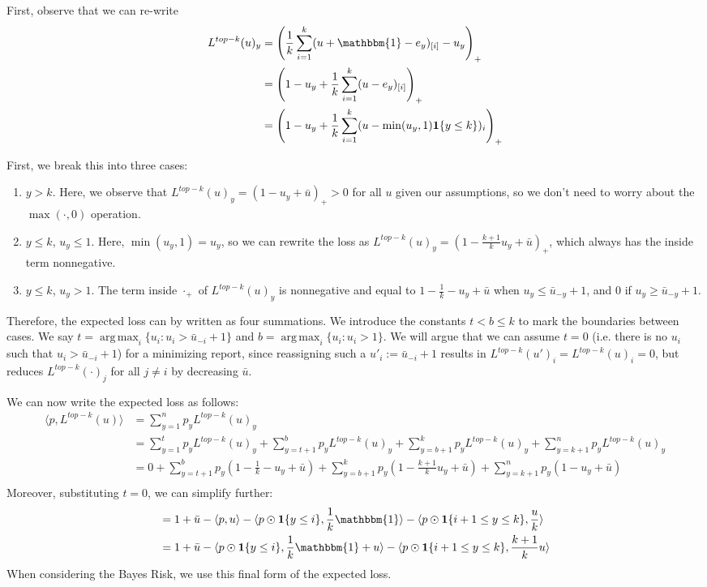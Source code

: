 \documentclass[12pt]{article}
\newcommand{\ubar}{\bar{u}}
\newcommand{\inprod}[2]{\langle #1, #2 \rangle}%
\newcommand{\ones}{\mathbbm{1}}
\newcommand{\Ind}[1]{\mathbf{1}\{#1\}}
\DeclareMathOperator*{\argmax}{arg\,max}
\begin{document}
First, observe that we can re-write
\begin{align*} 
L^{top-k}(u)_y&=\left(\frac{1}{k} \sum_{i=1}^k (u + \ones - e_y)_{[i]} - u_y \right)_+\\ 
&=\left(1 - u_y + \frac{1}{k} \sum_{i=1}^k (u - e_y)_{[i]} \right)_+\\
&=\left(1 - u_y + \frac{1}{k} \sum_{i=1}^k (u - \min(u_y, 1)\Ind{y \leq k})_{i} \right)_+\\
\end{align*}

First, we break this into three cases:
\begin{enumerate}
	\item $y > k$. Here, we observe that $L^{top-k}(u)_y = (1-u_y + \bar{u})_+ > 0$ for all $u$ given our assumptions, so we don't need to worry about the $\max(\cdot,0)$ operation.
	\item $y \leq k$, $u_y \leq 1$. Here, $\min(u_y,1) = u_y$, so we can rewrite the loss as $L^{top-k}(u)_y = (1 - \frac {k+1}{k} u_y + \bar u)_+$, which always has the inside term nonnegative.
	\item $y \leq k$, $u_y > 1$. The term inside $\cdot_+$ of $L^{top-k}(u)_y$ is nonnegative and equal to $1 - \frac 1 k - u_y + \ubar$ when $u_y \leq \bar{u}_{-y} + 1$, and $0$ if $u_y \geq \bar{u}_{-y} + 1$.
\end{enumerate}

Therefore, the expected loss can by written as four summations.
We introduce the constants $t < b \leq k$ to mark the boundaries between cases.
We say $t = \argmax_i \{u_i : u_i > \bar u_{-i} +1\}$ and $b = \argmax_i \{u_i : u_i > 1\}$.
We will argue that we can assume $t = 0$ (i.e. there is no $u_i$ such that $u_i > \bar u_{-i} +1$) for a minimizing report, since reassigning such a $u'_i := \bar u_{-i} +1$ results in $L^{top-k}(u')_i = L^{top-k}(u)_i = 0$, but reduces $L^{top-k}(\cdot)_j$ for all $j \neq i$ by decreasing $\ubar$.

We can now write the expected loss as follows:
\begin{align*}
\inprod{p}{L^{top-k}(u)} &= \sum_{y=1}^n p_y L^{top-k}(u)_y \\
&= \sum_{y=1}^t p_y L^{top-k}(u)_y + \sum_{y=t+1}^b p_y L^{top-k}(u)_y + \sum_{y=b+1}^k p_y L^{top-k}(u)_y + \sum_{y=k+1}^n p_y L^{top-k}(u)_y\\
&= 0 + \sum_{y=t+1}^b p_y (1 - \frac 1 k - u_y + \ubar) + \sum_{y=b+1}^k p_y (1 - \frac{k+1} k u_y + \ubar) + \sum_{y=k+1}^n p_y(1-u_y + \ubar)\\
\end{align*}
Moreover, substituting $t=0$, we can simplify further:
\begin{align*}
&= 1 + \ubar - \inprod{p}{u} - \inprod{p \odot \Ind{y \leq i}}{\frac 1 k \ones} - \inprod{p \odot \Ind{i+1 \leq y \leq k}}{ \frac u k}\\
&= 1 + \ubar - \inprod{p \odot \Ind{y \leq i}}{\frac 1 k \ones + u} - \inprod{p \odot \Ind{i+1 \leq y \leq k}}{ \frac {k+1} k u}\\
\end{align*}
When considering the Bayes Risk, we use this final form of the expected loss.
\end{document}
